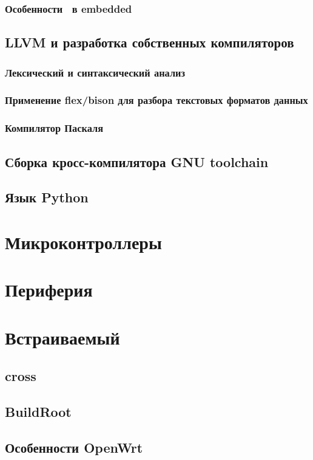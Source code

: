 \section{Особенности \cpp\ в embedded}

\chapter{LLVM и разработка собственных компиляторов}

\section{Лексический и синтаксический анализ}

\section{Применение flex/bison для разбора текстовых форматов данных}

\section{Компилятор Паскаля}

\chapter{Сборка кросс-компилятора GNU toolchain}

\chapter{Язык Python}

\part{Микроконтроллеры \cmx}

\part{Периферия}

\part{Встраиваемый \emlinux}

\chapter{cross}

\chapter{BuildRoot}

\chapter{Особенности OpenWrt}


